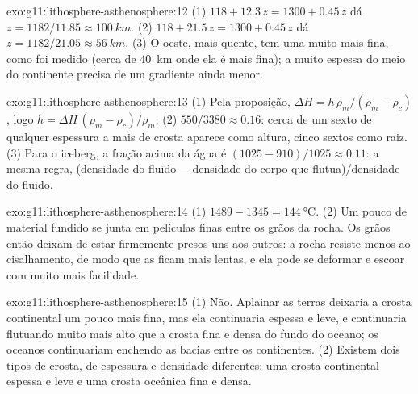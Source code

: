 \begin{solution}{exo:g11:lithosphere-asthenosphere:12}
(1) $118 + 12.3\,z = 1300 + 0.45\,z$ dá $z = 1182/11.85 \approx
\qty{100}{km}$. (2) $118 + 21.5\,z = 1300 + 0.45\,z$ dá $z = 1182/21.05
\approx \qty{56}{km}$. (3) O oeste, mais quente, tem uma  muito
mais fina, como foi medido (cerca de \qty{40}{km} onde ela é mais fina); a
 muito espessa do meio do continente precisa de um gradiente ainda
menor.
\end{solution}

\begin{solution}{exo:g11:lithosphere-asthenosphere:13}
(1) Pela proposição, $\Delta H = h\,\rho_m/(\rho_m - \rho_c)$, logo $h =
\Delta H\,(\rho_m - \rho_c)/\rho_m$. (2) $550/3380 \approx 0.16$: cerca de um
sexto de qualquer espessura a mais de crosta aparece como altura, cinco
sextos como raiz. (3) Para o iceberg, a fração acima da água é
$(1025 - 910)/1025 \approx 0.11$: a mesma regra, (densidade do fluido $-$
densidade do corpo que flutua)/densidade do fluido.
\end{solution}

\begin{solution}{exo:g11:lithosphere-asthenosphere:14}
(1) $1489 - 1345 = \qty{144}{\celsius}$. (2) Um pouco de material fundido se
junta em películas finas entre os grãos da rocha. Os grãos então deixam de
estar firmemente presos uns aos outros: a rocha resiste menos ao
cisalhamento, de modo que as  ficam mais lentas, e ela pode se
deformar e escoar com muito mais facilidade.
\end{solution}

\begin{solution}{exo:g11:lithosphere-asthenosphere:15}
(1) Não. Aplainar as terras deixaria a crosta continental um pouco mais
fina, mas ela continuaria espessa e leve, e continuaria flutuando muito mais
alto que a crosta fina e densa do fundo do oceano; os oceanos continuariam
enchendo as bacias entre os continentes. (2) Existem dois tipos de crosta,
de espessura e densidade diferentes: uma crosta continental espessa e leve e
uma crosta oceânica fina e densa.
\end{solution}

